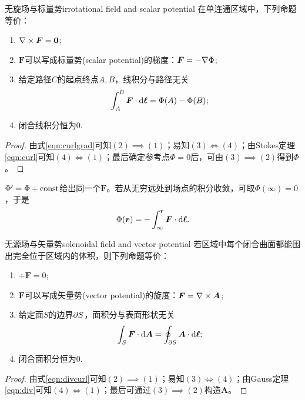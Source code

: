 \begin{theorem}{无旋场与标量势}{irrotational field and scalar potential}
    在单连通区域中，下列命题等价：
    \begin{enumerate}
        \item $\nabla\times\bm F = \bm 0$;
        \item $\bm F$可以写成标量势(scalar potential)的梯度：$\bm F = -\nabla\Phi$;
        \item 给定路径$C$的起点终点$A,B$，线积分与路径无关
        \begin{equation}
            \int_A^B\bm F \cdot \mathop{}\!\mathrm{d}\bm\ell = \Phi(A) - \Phi(B);
        \end{equation}
        \item 闭合线积分恒为0.
    \end{enumerate}
\end{theorem}
\begin{proof}
    由式\eqref{eqn:curlgrad}可知$(2) \implies (1)$；易知$(3) \iff (4)$；由Stokes定理\eqref{eqn:curl}可知$(4) \iff (1)$；最后确定参考点$\Phi = 0$后，可由$(3) \implies (2)$得到$\Phi$。
\end{proof}
\begin{remark}
    $\Phi' = \Phi + \mathrm{const}$给出同一个$\bm F$。若从无穷远处到场点的积分收敛，可取$\Phi(\infty) = 0$，于是
    \[
        \Phi(\bm r) = -\int_\infty^{\bm r}\bm F \cdot \mathop{}\!\mathrm{d}\bm\ell.
    \]
\end{remark}

\begin{theorem}{无源场与矢量势}{solenoidal field and vector potential}
    若区域中每个闭合曲面都能围出完全位于区域内的体积，则下列命题等价：
    \begin{enumerate}
        \item $\div\bm F = 0$;
        \item $\bm F$可以写成矢量势(vector potential)的旋度：$\bm F = \nabla\times\bm A$;
        \item 给定面$S$的边界$\partial S$，面积分与表面形状无关
        \begin{equation}
            \int_S\bm F \cdot \mathop{}\!\mathrm{d}\bm A = \oint_{\partial S}\bm A \cdot \mathop{}\!\mathrm{d}\bm\ell;
        \end{equation}
        \item 闭合面积分恒为0.
    \end{enumerate}
\end{theorem}
\begin{proof}
    由式\eqref{eqn:divcurl}可知$(2) \implies (1)$；易知$(3) \iff (4)$；由Gauss定理\eqref{eqn:div}可知$(4) \iff (1)$；最后可通过$(3) \implies (2)$构造$\bm A$。
\end{proof}

